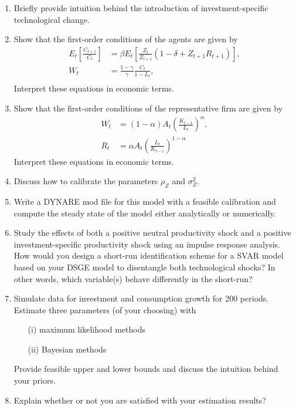 \documentclass[a4paper]{scrartcl}
\begin{document}
\begin{enumerate}
	\item Briefly provide intuition behind the introduction of investment-specific technological change.
	\item Show that the first-order conditions of the agents are given by
	\begin{align*}
	E_t\left[\frac{C_{t+1}}{C_{t}}\right] &= \beta E_t\left[ \frac{Z_t}{Z_{t+1}}\left(1-\delta + Z_{t+1} R_{t+1}\right)\right],\\
	W_t &= \frac{1-\gamma}{\gamma} \frac{C_{t}}{1-L_{t}},\\
	\end{align*}
	Interpret these equations in economic terms.
	
	\item Show that the first-order conditions of the representative firm are given by
	\begin{align*}
	W_t &= (1-\alpha) A_t \left(\frac{K_{t-1}}{L_t}\right)^\alpha, \\	
	R_t &= \alpha A_t \left(\frac{L_t}{K_{t-1}}\right)^{1-\alpha}
	\end{align*}
	Interpret these equations in economic terms.
	\item Discuss how to calibrate the parameters $\rho_Z$ and $\sigma_Z^2$.
	\item Write a DYNARE mod file for this model with a feasible calibration and compute the steady state of the model either analytically or numerically.
	\item Study the effects of both a positive neutral productivity shock and a positive investment-specific productivity shock using an impulse response analysis. How would you design a short-run identification scheme for a SVAR model based on your DSGE model to disentangle both technological shocks? In other words, which variable(s) behave differently in the short-run?
	\item Simulate data for investment and consumption growth for 200 periods. Estimate three parameters (of your choosing) with 
	\begin{itemize}
		\item[(i)] maximum likelihood methods
		\item[(ii)] Bayesian methods
	\end{itemize}
	Provide feasible upper and lower bounds and discuss the intuition behind your priors. 
	\item Explain whether or not you are satisfied with your estimation results?
\end{enumerate} 
\newpage
\end{document}
